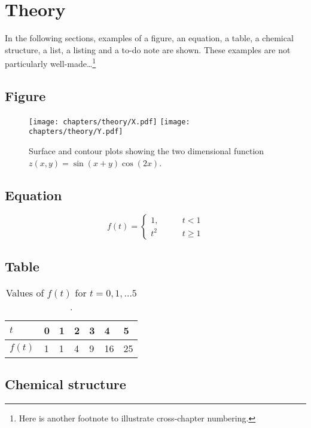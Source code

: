 \chapter{Theory}

In the following sections, examples of a figure, an equation, a table, a
chemical structure, a list, a listing and a to-do note are shown. These
examples are not particularly well-made\dots\footnote{Here is another footnote
	to illustrate cross-chapter numbering.}%

\section{Figure}
\begin{figure}[H]
	\centering
	\texttt{[image: chapters/theory/X.pdf]}
	\texttt{[image: chapters/theory/Y.pdf]}
	\caption{Surface and contour plots showing the two dimensional function $z(x,y)=\sin(x+y)\cos(2x)$.}
\end{figure}

\section{Equation}
\begin{equation}
	f(t)=\left\{%
	\begin{array}{ll}
		1,\qquad & t< 1    \\
		t^2      & t\geq 1
	\end{array}\right.
\end{equation}

\section{Table}
\begin{table}[H]
	\centering
	\caption[This (instead of the potentially long caption) appears in the list of tables.]{Values of $f(t)$ for $t=0,1,\dots 5$.}
	\begin{tabular}{lllllll}
		\toprule
		$t$    & 0 & 1 & 2 & 3 & 4  & 5  \\ \midrule
		$f(t)$ & 1 & 1 & 4 & 9 & 16 & 25 \\ \bottomrule
	\end{tabular}
\end{table}

\section{Chemical structure}
\begin{center}
\end{center}

